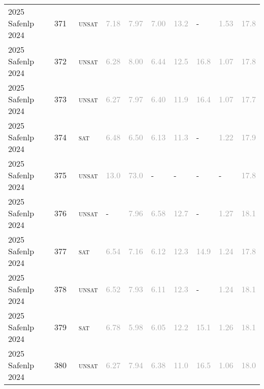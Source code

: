 \begin{center}
{\begin{longtable}{@{}llllllllll@{}}
2025 Safenlp 2024 & 371 & ~\textsc{unsat} & \textcolor{darkgray}{7.18} & \textcolor{darkgray}{7.97} & \textcolor{darkgray}{7.00} & \textcolor{darkgray}{13.2} & - & \textcolor{darkgray}{1.53} & \textcolor{darkgray}{17.8} \\
2025 Safenlp 2024 & 372 & ~\textsc{unsat} & \textcolor{darkgray}{6.28} & \textcolor{darkgray}{8.00} & \textcolor{darkgray}{6.44} & \textcolor{darkgray}{12.5} & \textcolor{darkgray}{16.8} & \textcolor{darkgray}{1.07} & \textcolor{darkgray}{17.8} \\
2025 Safenlp 2024 & 373 & ~\textsc{unsat} & \textcolor{darkgray}{6.27} & \textcolor{darkgray}{7.97} & \textcolor{darkgray}{6.40} & \textcolor{darkgray}{11.9} & \textcolor{darkgray}{16.4} & \textcolor{darkgray}{1.07} & \textcolor{darkgray}{17.7} \\
2025 Safenlp 2024 & 374 & ~\textsc{sat} & \textcolor{darkgray}{6.48} & \textcolor{darkgray}{6.50} & \textcolor{darkgray}{6.13} & \textcolor{darkgray}{11.3} & - & \textcolor{darkgray}{1.22} & \textcolor{darkgray}{17.9} \\
2025 Safenlp 2024 & 375 & ~\textsc{unsat} & \textcolor{darkgray}{13.0} & \textcolor{darkgray}{73.0} & - & - & - & - & \textcolor{darkgray}{17.8} \\
2025 Safenlp 2024 & 376 & ~\textsc{unsat} & - & \textcolor{darkgray}{7.96} & \textcolor{darkgray}{6.58} & \textcolor{darkgray}{12.7} & - & \textcolor{darkgray}{1.27} & \textcolor{darkgray}{18.1} \\
2025 Safenlp 2024 & 377 & ~\textsc{sat} & \textcolor{darkgray}{6.54} & \textcolor{darkgray}{7.16} & \textcolor{darkgray}{6.12} & \textcolor{darkgray}{12.3} & \textcolor{darkgray}{14.9} & \textcolor{darkgray}{1.24} & \textcolor{darkgray}{17.8} \\
2025 Safenlp 2024 & 378 & ~\textsc{unsat} & \textcolor{darkgray}{6.52} & \textcolor{darkgray}{7.93} & \textcolor{darkgray}{6.11} & \textcolor{darkgray}{12.3} & - & \textcolor{darkgray}{1.24} & \textcolor{darkgray}{18.1} \\
2025 Safenlp 2024 & 379 & ~\textsc{sat} & \textcolor{darkgray}{6.78} & \textcolor{darkgray}{5.98} & \textcolor{darkgray}{6.05} & \textcolor{darkgray}{12.2} & \textcolor{darkgray}{15.1} & \textcolor{darkgray}{1.26} & \textcolor{darkgray}{18.1} \\
2025 Safenlp 2024 & 380 & ~\textsc{unsat} & \textcolor{darkgray}{6.27} & \textcolor{darkgray}{7.94} & \textcolor{darkgray}{6.38} & \textcolor{darkgray}{11.0} & \textcolor{darkgray}{16.5} & \textcolor{darkgray}{1.06} & \textcolor{darkgray}{18.0} \\

\end{longtable}}
\end{center}
